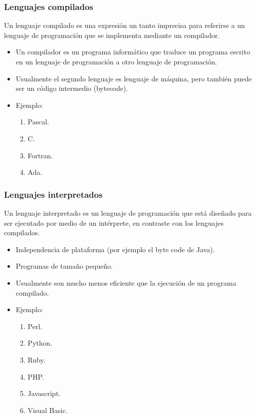 \documentclass{beamer}
\begin{document}
\begin{frame}
\frametitle{Lenguajes compilados}
Un lenguaje compilado es una expresión un tanto imprecisa para referirse a un lenguaje de programación que se implementa mediante un compilador.
\pause
\begin{itemize}[<+->]
\item Un compilador es un programa informático que traduce un programa escrito en un lenguaje de programación a otro lenguaje de programación.
\item Usualmente el segundo lenguaje es lenguaje de máquina, pero también puede ser un código intermedio (bytecode).
\item Ejemplo:
\begin{enumerate}
\item Pascal.
\item C.
\item Fortran.
\item Ada.
\end{enumerate}
\end{itemize}
\end{frame}

\begin{frame}
\frametitle{Lenguajes interpretados}
Un lenguaje interpretado es un lenguaje de programación que está diseñado para ser ejecutado por medio de un intérprete, en contraste con los lenguajes compilados.
\pause
\begin{itemize}[<+->]
\item Independencia de plataforma (por ejemplo el byte code de Java).
\item Programas de tamaño pequeño.
\item Usualmente son mucho menos eficiente que la ejecución de un programa compilado.
\item Ejemplo:
\begin{enumerate}
\item Perl.
\item Python.
\item Ruby.
\item PHP.
\item Javascript.
\item Visual Basic.
\end{enumerate}
\end{itemize}
\end{frame}
\end{document}
